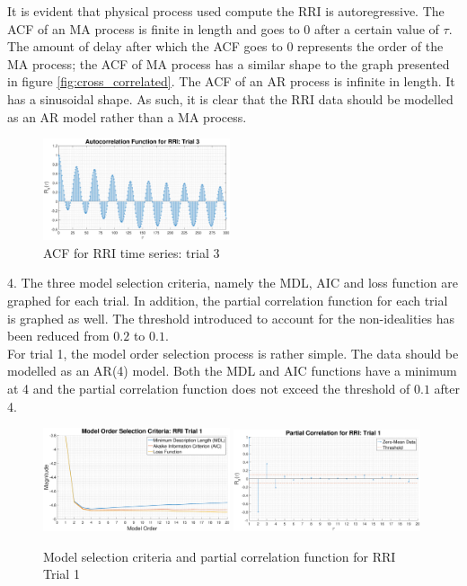 \documentclass{article}
\begin{document}
\newpage
It is evident that physical process used compute the RRI is autoregressive. The ACF of an MA process is finite in length and goes to 0 after a certain value of $\tau$. The amount of delay after which the ACF goes to 0 represents the order of the MA process; the ACF of MA process has a similar shape to the graph presented in figure \ref{fig:cross_correlated}. The ACF of an AR process is infinite in length. It has a sinusoidal shape. As such, it is clear that the RRI data should be modelled as an AR model rather than a MA process.  

\begin{figure}[H]
    \centering
    \includegraphics[width = 0.49\textwidth]{acf_rri_3}
    \caption{ACF for RRI time series: trial 3}
    \label{fig:acf_rri_2}
\end{figure}


4. The three model selection criteria, namely the MDL, AIC and loss function are graphed for each trial. In addition, the partial correlation function for each trial is graphed as well. The threshold introduced to account for the non-idealities has been reduced from $0.2$ to $0.1$. \\

For trial 1, the model order selection process is rather simple. The data should be modelled as an AR(4) model. Both the MDL and AIC functions have a minimum at 4 and the partial correlation function does not exceed the threshold of $0.1$ after 4.

\begin{figure}[H]
    \centering
    \includegraphics[width = 0.49\textwidth]{MLD_AIC_loss_rri_1}
    \includegraphics[width = 0.49\textwidth]{par_corr_rri_1}
    \caption{Model selection criteria and partial correlation function for RRI Trial 1}
    \label{fig:model_selection_rri_1}
\end{figure}
\end{document}
